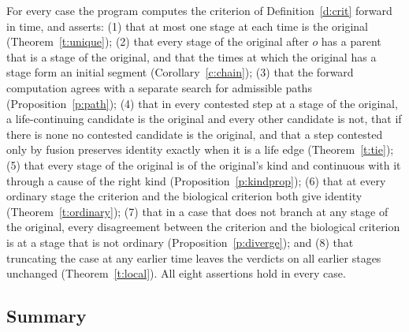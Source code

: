 \documentclass{situationist-preprint}
\begin{document}
For every case the program computes the criterion of Definition~\ref{d:crit} forward in time, and asserts: (1) that at most one stage at each time is the original (Theorem~\ref{t:unique}); (2) that every stage of the original after $o$ has a parent that is a stage of the original, and that the times at which the original has a stage form an initial segment (Corollary~\ref{c:chain}); (3) that the forward computation agrees with a separate search for admissible paths (Proposition~\ref{p:path}); (4) that in every contested step at a stage of the original, a life-continuing candidate is the original and every other candidate is not, that if there is none no contested candidate is the original, and that a step contested only by fusion preserves identity exactly when it is a life edge (Theorem~\ref{t:tie}); (5) that every stage of the original is of the original's kind and continuous with it through a cause of the right kind (Proposition~\ref{p:kindprop}); (6) that at every ordinary stage the criterion and the biological criterion both give identity (Theorem~\ref{t:ordinary}); (7) that in a case that does not branch at any stage of the original, every disagreement between the criterion and the biological criterion is at a stage that is not ordinary (Proposition~\ref{p:diverge}); and (8) that truncating the case at any earlier time leaves the verdicts on all earlier stages unchanged (Theorem~\ref{t:local}). All eight assertions hold in every case.

\subsection*{Summary}
\end{document}
